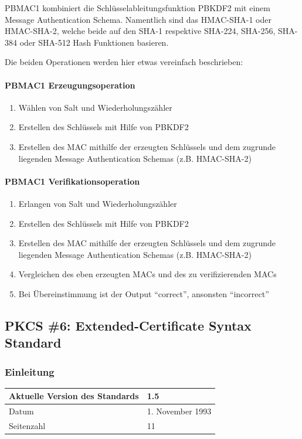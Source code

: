\documentclass[10pt,a4paper]{article}
\begin{document}
PBMAC1 kombiniert die Schlüsselableitungsfunktion PBKDF2 mit einem Message Authentication
Schema. Namentlich sind das HMAC-SHA-1 oder HMAC-SHA-2, welche beide auf den SHA-1
respektive SHA-224, SHA-256, SHA-384 oder SHA-512 Hash Funktionen basieren.

Die beiden Operationen werden hier etwas vereinfach beschrieben:

\paragraph{PBMAC1 Erzeugungsoperation}
\begin{enumerate}
    \item Wählen von Salt und Wiederholungszähler
    \item Erstellen des Schlüssels mit Hilfe von PBKDF2
    \item Erstellen des MAC mithilfe der erzeugten Schlüssels und dem zugrunde liegenden
        Message Authentication Schemas (z.B. HMAC-SHA-2)
\end{enumerate}

\paragraph{PBMAC1 Verifikationsoperation}
\begin{enumerate}
    \item Erlangen von Salt und Wiederholungszähler
    \item Erstellen des Schlüssels mit Hilfe von PBKDF2
    \item Erstellen des MAC mithilfe der erzeugten Schlüssels und dem zugrunde liegenden
        Message Authentication Schemas (z.B. HMAC-SHA-2)
    \item Vergleichen des eben erzeugten MACs und des zu verifizierenden MACs
    \item Bei Übereinstimmung ist der Output "`correct"', ansonsten "`incorrect"'
\end{enumerate}

\subsection{PKCS \#6: Extended-Certificate Syntax Standard}

\subsubsection{Einleitung}
\begin{table}[ht]
    \centering
    \begin{tabular}{|l|l|} \hline
        Aktuelle Version des Standards & 1.5 \\\hline
        Datum & 1. November 1993 \\\hline
        Seitenzahl & 11 \\\hline
    \end{tabular}
\end{table}
\end{document}
